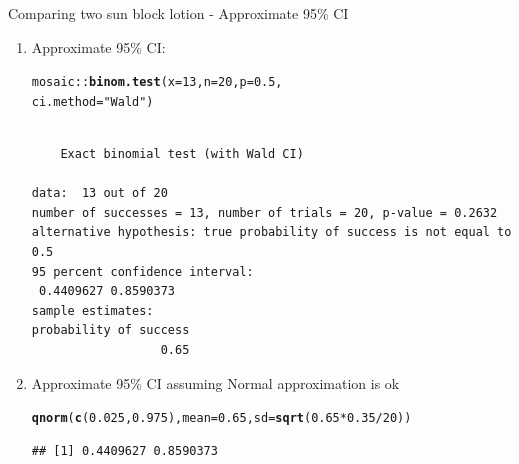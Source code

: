 \documentclass{beamer}\usepackage[]{graphicx}\usepackage[]{color}
\newcommand{\hlnum}[1]{\textcolor[rgb]{0.686,0.059,0.569}{#1}}%
\newcommand{\hlstr}[1]{\textcolor[rgb]{0.192,0.494,0.8}{#1}}%
\newcommand{\hlopt}[1]{\textcolor[rgb]{0,0,0}{#1}}%
\newcommand{\hlstd}[1]{\textcolor[rgb]{0.345,0.345,0.345}{#1}}%
\newcommand{\hlkwc}[1]{\textcolor[rgb]{0.333,0.667,0.333}{#1}}%
\newcommand{\hlkwd}[1]{\textcolor[rgb]{0.737,0.353,0.396}{\textbf{#1}}}%
\newenvironment{knitrout}{}{} %
\begin{document}
\begin{frame}[fragile]{Comparing two sun block lotion - Approximate 95\% CI}
\small
\begin{enumerate}
	\setlength\itemsep{1em}
	
	\item Approximate 95\% CI:
\begin{knitrout}\scriptsize
{}\color{fgcolor}
\begin{alltt}
\hlstd{mosaic}\hlopt{::}\hlkwd{binom.test}\hlstd{(}\hlkwc{x} \hlstd{=} \hlnum{13}\hlstd{,} \hlkwc{n} \hlstd{=} \hlnum{20}\hlstd{,} \hlkwc{p} \hlstd{=} \hlnum{0.5}\hlstd{,}
\hlkwc{ci.method} \hlstd{=} \hlstr{"Wald"}\hlstd{)}
\end{alltt}
\begin{verbatim}

	Exact binomial test (with Wald CI)

data:  13 out of 20
number of successes = 13, number of trials = 20, p-value = 0.2632
alternative hypothesis: true probability of success is not equal to 0.5
95 percent confidence interval:
 0.4409627 0.8590373
sample estimates:
probability of success 
                  0.65 
\end{verbatim}

\end{knitrout}
	
		
	\item Approximate 95\% CI assuming Normal approximation is ok 
\begin{knitrout}\scriptsize
{}\color{fgcolor}
\begin{alltt}
\hlkwd{qnorm}\hlstd{(}\hlkwd{c}\hlstd{(}\hlnum{0.025}\hlstd{,} \hlnum{0.975}\hlstd{),} \hlkwc{mean} \hlstd{=} \hlnum{0.65}\hlstd{,} \hlkwc{sd} \hlstd{=} \hlkwd{sqrt}\hlstd{(}\hlnum{0.65}\hlopt{*}\hlnum{0.35} \hlopt{/} \hlnum{20}\hlstd{))}
\end{alltt}
\begin{verbatim}
## [1] 0.4409627 0.8590373
\end{verbatim}

\end{knitrout}
	
\end{enumerate}

\end{frame}
\end{document}
